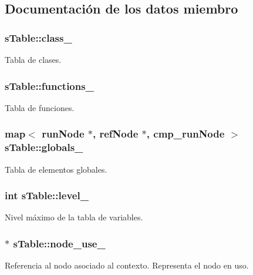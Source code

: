 \subsection{Documentación de los datos miembro}
\hypertarget{classsTable_ae3ed8713b34d93d63addf914333c9766}{
\subsubsection[{class\-\_\-}]{ s\-Table\-::class\-\_\-\hspace{0.3cm}{\ttfamily [static]}}}\label{classsTable_ae3ed8713b34d93d63addf914333c9766}
Tabla de clases. \hypertarget{classsTable_ac39633c58e4f659879f0292af0a3ea48}{
\subsubsection[{functions\-\_\-}]{ s\-Table\-::functions\-\_\-}}\label{classsTable_ac39633c58e4f659879f0292af0a3ea48}
Tabla de funciones. \hypertarget{classsTable_a1f57f04be1d59b8c5ac8c58afc2a2687}{
\subsubsection[{globals\-\_\-}]{\setlength{\rightskip}{0pt plus 5cm}map$<$ {\bf run\-Node} $\ast$, {\bf ref\-Node} $\ast$, {\bf cmp\-\_\-run\-Node} $>$ s\-Table\-::globals\-\_\-\hspace{0.3cm}{\ttfamily [static]}}}\label{classsTable_a1f57f04be1d59b8c5ac8c58afc2a2687}
Tabla de elementos globales. \hypertarget{classsTable_a549ab9d5d0aad41d8289c693de39d328}{
\subsubsection[{level\-\_\-}]{\setlength{\rightskip}{0pt plus 5cm}int s\-Table\-::level\-\_\-}}\label{classsTable_a549ab9d5d0aad41d8289c693de39d328}
Nivel máximo de la tabla de variables. \hypertarget{classsTable_a7f0eed1e3a2f06e80900d4034d7c7e25}{
\subsubsection[{node\-\_\-use\-\_\-}]{$\ast$ s\-Table\-::node\-\_\-use\-\_\-}}\label{classsTable_a7f0eed1e3a2f06e80900d4034d7c7e25}
Referencia al nodo asociado al contexto. Representa el nodo en uso.

